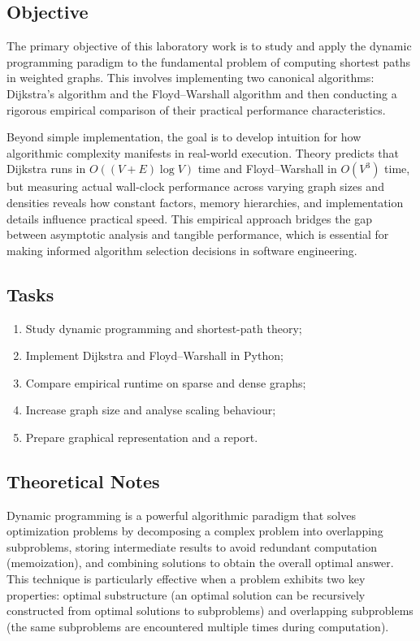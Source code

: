 \documentclass[12pt]{article}
\begin{document}
\subsection{Objective}

The primary objective of this laboratory work is to study and apply the dynamic programming paradigm
to the fundamental problem of computing shortest paths in weighted graphs. This involves implementing
two canonical algorithms: Dijkstra's algorithm and the Floyd--Warshall algorithm and then conducting
a rigorous empirical comparison of their practical performance characteristics.

Beyond simple implementation, the goal is to develop intuition for how algorithmic complexity manifests
in real-world execution. Theory predicts that Dijkstra runs in $O((V+E)\log V)$ time and Floyd--Warshall
in $O(V^3)$ time, but measuring actual wall-clock performance across varying graph sizes and densities
reveals how constant factors, memory hierarchies, and implementation details influence practical speed.
This empirical approach bridges the gap between asymptotic analysis and tangible performance, which is
essential for making informed algorithm selection decisions in software engineering.

\subsection{Tasks}

\begin{enumerate}[itemsep=1pt]
  \item Study dynamic programming and shortest-path theory;
  \item Implement Dijkstra and Floyd--Warshall in Python;
  \item Compare empirical runtime on sparse and dense graphs;
  \item Increase graph size and analyse scaling behaviour;
  \item Prepare graphical representation and a report.
\end{enumerate}

\subsection{Theoretical Notes}

Dynamic programming is a powerful algorithmic paradigm that solves optimization
problems by decomposing a complex problem into overlapping subproblems, storing intermediate
results to avoid redundant computation (memoization), and combining solutions to obtain the
overall optimal answer. This technique is particularly effective when a problem exhibits two
key properties: optimal substructure (an optimal solution can be recursively constructed from
optimal solutions to subproblems) and overlapping subproblems (the same subproblems are
encountered multiple times during computation).
\end{document}
